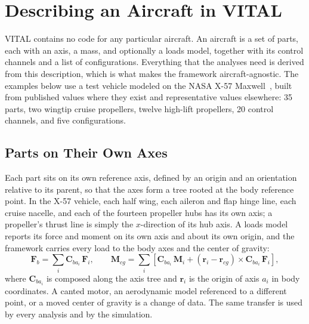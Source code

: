 \documentclass[conf]{new-aiaa}
\newcommand{\vect}[1]{\mathbf{#1}}
\begin{document}
\section{Describing an Aircraft in VITAL}
VITAL contains no code for any particular aircraft. An aircraft is a set of parts, each with
an axis, a mass, and optionally a loads model, together with its control channels and a list
of configurations. Everything that the analyses need is derived from this description, which
is what makes the framework aircraft-agnostic. The examples below use a test vehicle modeled
on the NASA X-57 Maxwell~\cite{x57fs,heeg2019}, built from published values where they exist
and representative values elsewhere: 35 parts, two wingtip cruise propellers, twelve high-lift
propellers, 20 control channels, and five configurations.

\subsection{Parts on Their Own Axes}
Each part sits on its own reference axis, defined by an origin and an orientation relative to
its parent, so that the axes form a tree rooted at the body reference point. In the X-57
vehicle, each half wing, each aileron and flap hinge line, each cruise nacelle, and each of the
fourteen propeller hubs has its own axis; a propeller's thrust line is simply the
$x$-direction of its hub axis. A loads model reports its force and moment on its own axis and
about its own origin, and the framework carries every load to the body axes and the center of
gravity:
\begin{equation}
\label{eq:loads}
\vect{F}_b = \sum_i \vect{C}_{b a_i}\,\vect{F}_i, \qquad
\vect{M}_{cg} = \sum_i \left[\vect{C}_{b a_i}\,\vect{M}_i
  + \left(\vect{r}_i - \vect{r}_{cg}\right) \times \vect{C}_{b a_i}\,\vect{F}_i\right],
\end{equation}
where $\vect{C}_{ba_i}$ is composed along the axis tree and $\vect{r}_i$ is the origin of axis
$a_i$ in body coordinates. A canted motor, an aerodynamic model referenced to a different
point, or a moved center of gravity is a change of data. The same transfer is used by every
analysis and by the simulation.
\end{document}
